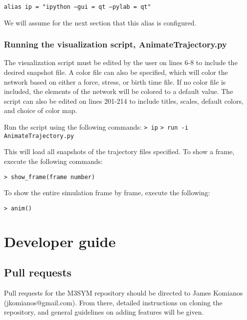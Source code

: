 \documentclass[11pt, oneside]{article}   	%
\begin{document}
\texttt{alias ip = "ipython --gui = qt --pylab = qt"}\newline

\noindent We will assume for the next section that this alias is configured.


\subsubsection{Running the visualization script, AnimateTrajectory.py}

The visualization script must be edited by the user on lines 6-8 to include the desired snapshot file. A color file can also be specified, which will color the network based on either a force, stress, or birth time file. If no color file is included, the elements of the network will be colored to a default value. The script can also be edited on lines 201-214 to include titles, scales, default colors, and choice of color map. \newline

\noindent Run the script using the following commands:\newline\newline
\indent\texttt{> ip}\newline
\indent\texttt{> run -i AnimateTrajectory.py}\newline

\noindent This will load all snapshots of the trajectory files specified. To show a frame, execute the following commands:\newline

\texttt{> show\_frame(frame number)}\newline

\noindent To show the entire simulation frame by frame, execute the following:\newline

\texttt{> anim()}

\section{Developer guide}

\subsection{Pull requests}

Pull requests for the M3SYM repository should be directed to James Komianos (jkomianos@gmail.com). From there, detailed instructions on cloning the repository, and general guidelines on adding features will be given.
\end{document}
